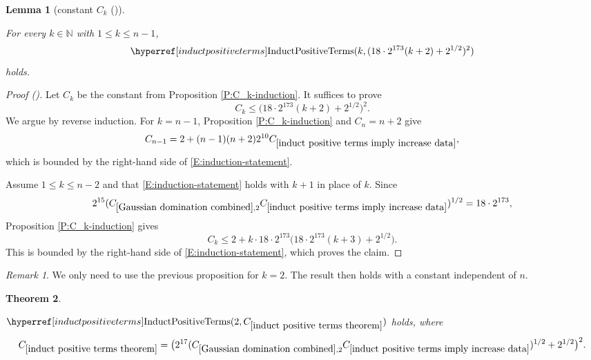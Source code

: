 \documentclass[12pt,reqno]{amsart}
\newcommand{\auto}{{({\tiny\faCar})}}
\theoremstyle{plain}
\newtheorem{theorem}{Theorem}[section]
\newtheorem{lemma}[theorem]{Lemma}
\numberwithin{equation}{section}
\theoremstyle{remark}
\newtheorem{rem}{Remark}[section]
\newcommand{\uses}[1]{}
\newcommand{\usesdefs}[1]{}
\newcommand{\leanok}{}
\newcommand{\lean}[1]{}
\newcommand{\N}{{\mathbb N}}
\begin{document}
\begin{lemma}[constant $C_k$ \auto]\label{P:better-induction}\uses{P:C_k-induction,Gaussian domination combined,induct positive terms imply increase data}\usesdefs{induct positive terms}
\lean{Auto.betterInduction}
\leanok
For every $k\in\N$ with $1\le k\le n-1$,
\begin{equation}\label{auto:positive-induction-local-bound}
\InductPositiveTerms{k,
(18\cdot2^{173}(k+2)+2^{1/2})^2}
\end{equation}
holds.
\end{lemma}
\begin{proof}[Proof \auto]
Let $C_k$ be the constant from Proposition \ref{P:C_k-induction}. It suffices to prove
\begin{equation}\label{E:induction-statement}
C_k\le
\bigl(18\cdot2^{173}(k+2)+2^{1/2}\bigr)^2.
\end{equation}
We argue by reverse induction. For $k=n-1$, Proposition \ref{P:C_k-induction} and $C_n=n+2$ give
\[
C_{n-1}
=2+(n-1)(n+2)2^{10}C_{\ref{induct positive terms imply increase data}},
\]
which is bounded by the right-hand side of \eqref{E:induction-statement}.

Assume $1\le k\le n-2$ and that \eqref{E:induction-statement} holds with $k+1$ in place of $k$. Since
\[
2^{15}(C_{\ref{Gaussian domination combined},2}C_{\ref{induct positive terms imply increase data}})^{1/2}
=18\cdot2^{173},
\]
Proposition \ref{P:C_k-induction} gives
\[
C_k
\le
2+k\cdot18\cdot2^{173}
\bigl(18\cdot2^{173}(k+3)+2^{1/2}\bigr).
\]
This is bounded by the right-hand side of \eqref{E:induction-statement}, which proves the claim.
\end{proof}

\begin{rem}
We only need to use the previous proposition for $k=2$. The result then holds with a constant independent of $n$.
\end{rem}

\begin{theorem}\label{induct positive terms theorem}\uses{P:better-induction,P:C_k-induction}\usesdefs{induct positive terms}
\lean{Auto.inductPositiveTermsTheorem}
\leanok
$\InductPositiveTerms{2,C_{\ref{induct positive terms theorem}}}$ holds, where
\begin{equation}\label{auto:positive-induction-constant-definition}
C_{\ref{induct positive terms theorem}}
=
\bigl(2^{17}(C_{\ref{Gaussian domination combined},2}C_{\ref{induct positive terms imply increase data}})^{1/2}+2^{1/2}\bigr)^2.
\end{equation}
\end{theorem}
\end{document}
